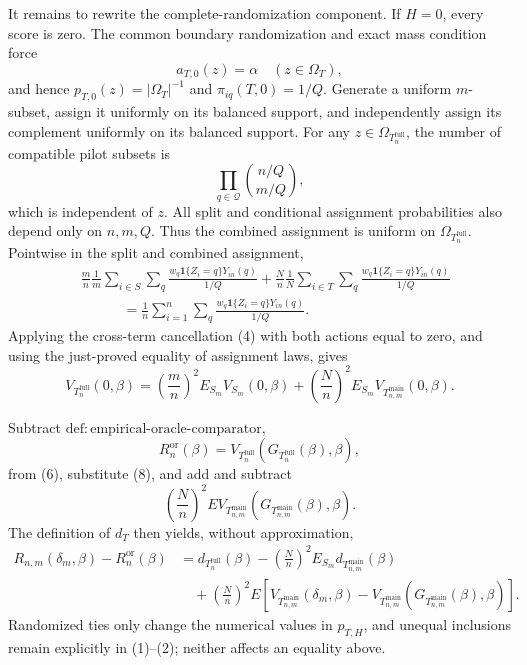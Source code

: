 It remains to rewrite the complete-randomization component.  If \(H=0\), every score is zero.  The common boundary randomization and exact mass condition force
\[
a_{T,0}(z)=\alpha\quad(z\in\Omega_T),
\]
and hence \(p_{T,0}(z)=|\Omega_T|^{-1}\) and \(\pi_{iq}(T,0)=1/Q\).  Generate a uniform \(m\)-subset, assign it uniformly on its balanced support, and independently assign its complement uniformly on its balanced support.  For any \(z\in\Omega_{T_n^{\mathrm{full}}}\), the number of compatible pilot subsets is
\[
\prod_{q\in\mathcal Q}{n/Q\choose m/Q},
\]
which is independent of \(z\).  All split and conditional assignment probabilities also depend only on \(n,m,Q\).  Thus the combined assignment is uniform on \(\Omega_{T_n^{\mathrm{full}}}\).  Pointwise in the split and combined assignment,
\[
\begin{aligned}
&\frac mn\frac1m\sum_{i\in S}\sum_q
\frac{w_q\mathbf 1\{Z_i=q\}Y_{in}(q)}{1/Q}
+\frac Nn\frac1N\sum_{i\in T}\sum_q
\frac{w_q\mathbf 1\{Z_i=q\}Y_{in}(q)}{1/Q}\\
&\hspace{3em}
=\frac1n\sum_{i=1}^n\sum_q
\frac{w_q\mathbf 1\{Z_i=q\}Y_{in}(q)}{1/Q}.
\end{aligned}
\tag{7}
\]
Applying the cross-term cancellation (4) with both actions equal to zero, and using the just-proved equality of assignment laws, gives
\[
V_{T_n^{\mathrm{full}}}(0,\beta)
=\left(\frac mn\right)^2E_{S_m}V_{S_m}(0,\beta)
+\left(\frac Nn\right)^2E_{S_m}
V_{T_{n,m}^{\mathrm{main}}}(0,\beta).
\tag{8}
\]

Subtract \(\mathrm{def{:}empirical\text{-}oracle\text{-}comparator}\),
\[
R_n^{\mathrm{or}}(\beta)
=V_{T_n^{\mathrm{full}}}
\!\left(G_{T_n^{\mathrm{full}}}(\beta),\beta\right),
\]
from (6), substitute (8), and add and subtract
\[
\left(\frac Nn\right)^2E
V_{T_{n,m}^{\mathrm{main}}}
\!\left(G_{T_{n,m}^{\mathrm{main}}}(\beta),\beta\right).
\]
The definition of \(d_T\) then yields, without approximation,
\[
\begin{aligned}
R_{n,m}(\delta_m,\beta)-R_n^{\mathrm{or}}(\beta)
&=d_{T_n^{\mathrm{full}}}(\beta)
-\left(\frac Nn\right)^2E_{S_m}
d_{T_{n,m}^{\mathrm{main}}}(\beta)\\
&\quad+\left(\frac Nn\right)^2E\!\left[
V_{T_{n,m}^{\mathrm{main}}}(\delta_m,\beta)
-V_{T_{n,m}^{\mathrm{main}}}
\!\left(G_{T_{n,m}^{\mathrm{main}}}(\beta),\beta\right)
\right].
\end{aligned}
\]
Randomized ties only change the numerical values in \(p_{T,H}\), and unequal inclusions remain explicitly in (1)--(2); neither affects an equality above.

